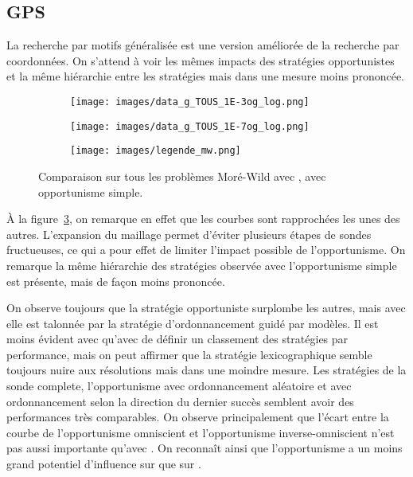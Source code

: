 \subsection{GPS}\label{sec:cgp}
La recherche par motifs généralisée est une version améliorée de la recherche par coordonnées. On s'attend à voir les mêmes impacts des stratégies opportunistes et la même hiérarchie entre les stratégies mais dans une mesure moins prononcée.
\begin{figure}[!htb]
	\centering
	\begin{subfigure}{0.43\textwidth}
		\texttt{[image: images/data\_g\_TOUS\_1E-3og\_log.png]}
		\label{fig:data_g_TOUS_1E-3og_log}
	\end{subfigure}%
	\begin{subfigure}{0.43\textwidth}
		\texttt{[image: images/data\_g\_TOUS\_1E-7og\_log.png]}
		\label{fig:data_g_TOUS_1E-7og_log}
	\end{subfigure}
	\smallskip
	\begin{subfigure}{0.95\textwidth}
		\texttt{[image: images/legende\_mw.png]}
	\end{subfigure}
	\caption{Comparaison sur tous les problèmes Moré-Wild avec \GPS, avec opportunisme simple.}
	\label{fig:gpsmw}
\end{figure}
À la figure~\ref{fig:gpsmw}, on remarque en effet que les courbes sont rapprochées les unes des autres. L'expansion du maillage permet d'éviter plusieurs étapes de sondes fructueuses, ce qui a pour effet de limiter l'impact possible de l'opportunisme. On remarque la même hiérarchie des stratégies observée avec l'opportunisme simple est présente, mais de façon moins prononcée. 

On observe toujours que la stratégie opportuniste surplombe les autres, mais avec \GPS elle est talonnée par la stratégie d'ordonnancement guidé par modèles. Il est moins évident avec \GPS qu'avec \CS de définir un classement des stratégies par performance, mais on peut affirmer que la stratégie lexicographique semble toujours nuire aux résolutions mais dans une moindre mesure. Les stratégies de la sonde complete, l'opportunisme avec ordonnancement aléatoire et avec ordonnancement selon la direction du dernier succès semblent avoir des performances très comparables. On observe principalement que l'écart entre la courbe de l'opportunisme omniscient et l'opportunisme inverse-omniscient n'est pas aussi importante qu'avec \CS. On reconnaît ainsi que l'opportunisme a un moins grand potentiel d'influence sur \GPS que sur \CS.

